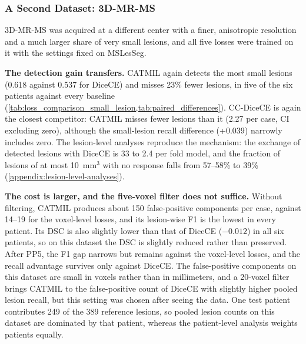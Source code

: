 \subsubsection{A Second Dataset: 3D-MR-MS}
\label{sec:3dmrms}

3D-MR-MS was acquired at a different center with a finer, anisotropic
resolution and a much larger share of very small lesions, and all five
losses were trained on it with the settings fixed on MSLesSeg.

\textbf{The detection gain transfers.} CATMIL again detects the most small
lesions (0.618 against 0.537 for DiceCE) and misses 23\% fewer lesions,
in five of the six patients against every baseline
(\cref{tab:loss_comparison_small_lesion,tab:paired_differences}).
CC-DiceCE is again the closest competitor: CATMIL misses fewer lesions
than it (2.27 per case, CI excluding zero), although the small-lesion
recall difference (+0.039) narrowly includes zero. The lesion-level
analyses reproduce the mechanism: the exchange of detected lesions with
DiceCE is 33 to 2.4 per fold model, and the fraction of lesions of at most
10~mm$^3$ with no response falls from 57--58\% to 39\%
(\cref{appendix:lesion-level-analyses}).

\textbf{The cost is larger, and the five-voxel filter does not suffice.}
Without filtering, CATMIL produces about 150 false-positive components per
case, against 14--19 for the voxel-level losses, and its lesion-wise F1 is
the lowest in every patient. Its DSC is also slightly lower than that of
DiceCE ($-0.012$) in all six patients, so on this dataset the DSC is
slightly reduced rather than preserved. After PP5, the F1 gap narrows but
remains against the voxel-level losses, and the recall advantage survives
only against DiceCE. The false-positive components on this dataset are
small in voxels rather than in millimeters, and a 20-voxel filter brings
CATMIL to the false-positive count of DiceCE with slightly higher pooled lesion recall,
but this setting was chosen after seeing the data. One test patient
contributes 249 of the 389 reference lesions, so pooled lesion counts on
this dataset are dominated by that patient, whereas the patient-level
analysis weights patients equally.
